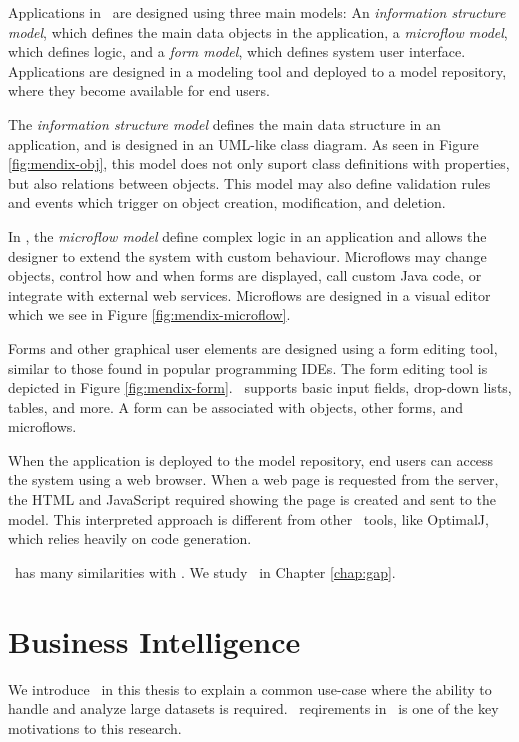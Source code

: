 Applications in \mendix~are designed using three main models: An \textit{information structure model}, which defines the main data objects in the application, a \textit{microflow model}, which defines logic, and a \textit{form model}, which defines system user interface. Applications are designed in a modeling tool and deployed to a model repository, where they become available for end users.

The \textit{information structure model} defines the main data structure in an application, and is designed in an UML-like class diagram. As seen in Figure \ref{fig:mendix-obj}, this model does not only suport class definitions with properties, but also relations between objects. This model may also define validation rules and events which trigger on object creation, modification, and deletion.

In \mendix, the \textit{microflow model} define complex logic in an application and allows the designer to extend the system with custom behaviour. Microflows may change objects, control how and when forms are displayed, call custom Java code, or integrate with external web services. Microflows are designed in a visual editor which we see in Figure \ref{fig:mendix-microflow}. 

Forms and other graphical user elements are designed using a form editing tool, similar to those found in popular programming IDEs. The form editing tool is depicted in Figure \ref{fig:mendix-form}. \mendix~supports basic input fields, drop-down lists, tables, and more. A form can be associated with objects, other forms, and microflows. 

When the application is deployed to the model repository, end users can access the system using a web browser. When a web page is requested from the server, the HTML and JavaScript required showing the page is created and sent to the model. This interpreted approach is different from other \mde~tools, like OptimalJ, which relies heavily on code generation. 

\gap~has many similarities with \mendix. We study \gap~in Chapter \ref{chap:gap}.

\section{Business Intelligence}
\label{sec:Business Intelligence}
We introduce \bi~in this thesis to explain a common use-case where the ability to handle and analyze large datasets is required. \bi~reqirements in \gap~is one of the key motivations to this research. 

